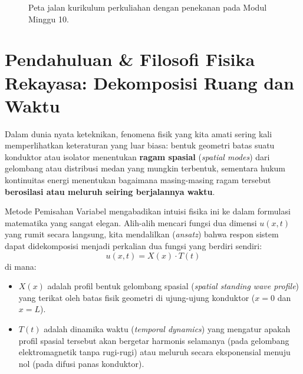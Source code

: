 \documentclass[11pt,a4paper]{article}
\theoremstyle{definition}
\begin{document}
\begin{figure}[htbp]
{%
}
\caption{Peta jalan kurikulum perkuliahan dengan penekanan pada Modul Minggu 10.}
\label{fig:peta_jalan_pd_w10}
\end{figure}

\section{Pendahuluan \& Filosofi Fisika Rekayasa: Dekomposisi Ruang dan Waktu}

Dalam dunia nyata keteknikan, fenomena fisik yang kita amati sering kali memperlihatkan keteraturan yang luar biasa: bentuk geometri batas suatu konduktor atau isolator menentukan \textbf{ragam spasial} (\textit{spatial modes}) dari gelombang atau distribusi medan yang mungkin terbentuk, sementara hukum kontinuitas energi menentukan bagaimana masing-masing ragam tersebut \textbf{berosilasi atau meluruh seiring berjalannya waktu}.

Metode Pemisahan Variabel mengabadikan intuisi fisika ini ke dalam formulasi matematika yang sangat elegan. Alih-alih mencari fungsi dua dimensi $u(x, t)$ yang rumit secara langsung, kita mendalilkan (\textit{ansatz}) bahwa respon sistem dapat didekomposisi menjadi perkalian dua fungsi yang berdiri sendiri:
\begin{equation}
    u(x, t) = X(x) \cdot T(t)
    \label{eq:ansatz_xt}
\end{equation}
di mana:
\begin{itemize}[leftmargin=*]
    \item $X(x)$ adalah profil bentuk gelombang spasial (\textit{spatial standing wave profile}) yang terikat oleh batas fisik geometri di ujung-ujung konduktor ($x = 0$ dan $x = L$).
    \item $T(t)$ adalah dinamika waktu (\textit{temporal dynamics}) yang mengatur apakah profil spasial tersebut akan bergetar harmonis selamanya (pada gelombang elektromagnetik tanpa rugi-rugi) atau meluruh secara eksponensial menuju nol (pada difusi panas konduktor).
\end{itemize}
\end{document}
